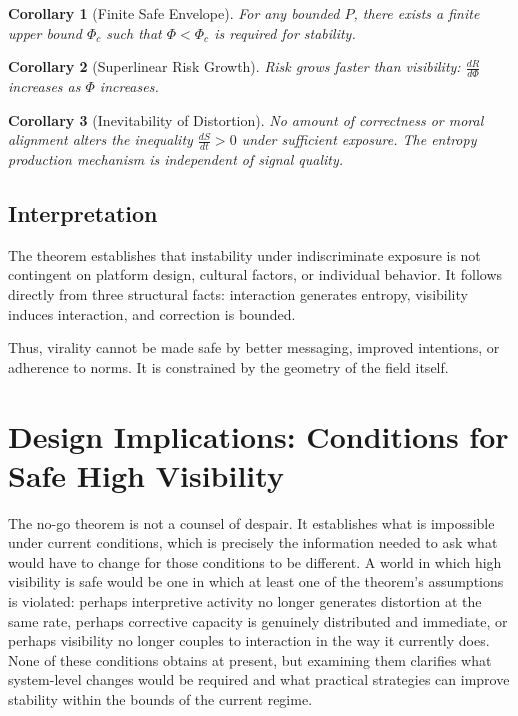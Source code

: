 \documentclass[12pt,a4paper]{article}
\newtheorem{corollary}{Corollary}[theorem]
\begin{document}
\begin{corollary}[Finite Safe Envelope]
For any bounded $P$, there exists a finite upper bound $\Phi_c$ such that $\Phi < \Phi_c$ is required for stability.
\end{corollary}

\begin{corollary}[Superlinear Risk Growth]
Risk grows faster than visibility: $\frac{dR}{d\Phi}$ increases as $\Phi$ increases.
\end{corollary}

\begin{corollary}[Inevitability of Distortion]
No amount of correctness or moral alignment alters the inequality $\frac{dS}{dt} > 0$ under sufficient exposure. The entropy production mechanism is independent of signal quality.
\end{corollary}

\subsection{Interpretation}

The theorem establishes that instability under indiscriminate exposure is not contingent on platform design, cultural factors, or individual behavior. It follows directly from three structural facts: interaction generates entropy, visibility induces interaction, and correction is bounded.

Thus, virality cannot be made safe by better messaging, improved intentions, or adherence to norms. It is constrained by the geometry of the field itself.

\section{Design Implications: Conditions for Safe High Visibility}

The no-go theorem is not a counsel of despair. It establishes what is impossible under current conditions, which is precisely the information needed to ask what would have to change for those conditions to be different. A world in which high visibility is safe would be one in which at least one of the theorem's assumptions is violated: perhaps interpretive activity no longer generates distortion at the same rate, perhaps corrective capacity is genuinely distributed and immediate, or perhaps visibility no longer couples to interaction in the way it currently does. None of these conditions obtains at present, but examining them clarifies what system-level changes would be required and what practical strategies can improve stability within the bounds of the current regime.
\end{document}
